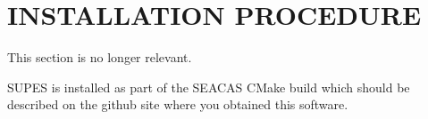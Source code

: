 \chapter{INSTALLATION PROCEDURE} \label{sec:install}
This section is no longer relevant.

SUPES is installed as part of the
SEACAS CMake build which should be described on the github site where
you obtained this software.
